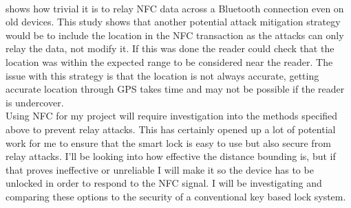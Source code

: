 \\
\indent\cite{Francis2010} shows how trivial it is to relay NFC data across a Bluetooth connection even on old devices. This study shows that another potential attack mitigation strategy would be to include the location in the NFC transaction as the attacks can only relay the data, not modify it. If this was done the reader could check that the location was within the expected range to be considered near the reader. The issue with this strategy is that the location is not always accurate, getting accurate location through GPS takes time and may not be possible if the reader is undercover.
\\
\indent Using NFC for my project will require investigation into the methods specified above to prevent relay attacks. This has certainly opened up a lot of potential work for me to ensure that the smart lock is easy to use but also secure from relay attacks. I'll be looking into how effective the distance bounding is, but if that proves ineffective or unreliable I will make it so the device has to be unlocked in order to respond to the NFC signal. I will be investigating and comparing these options to the security of a conventional key based lock system.

